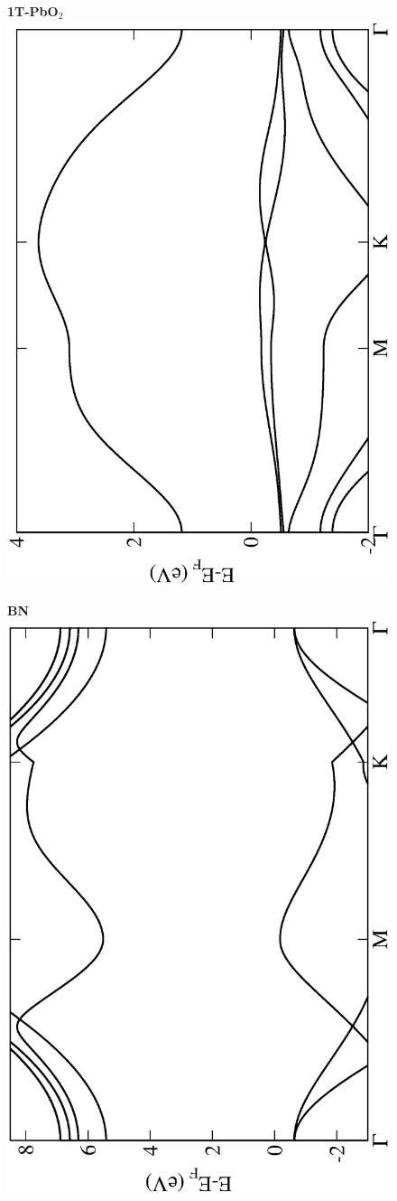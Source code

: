 \begin{figure}[htbp]
\centering
{\bfseries \sffamily 1T-PbO$_{2}$}\\
\includegraphics[width=0.45\linewidth, angle=-90, trim={2.9cm, 0cm, 2cm, 0cm}, clip]{img/SI_figs/BS/1T-PbO2.eps}
\end{figure}

\begin{figure}[htbp]
\centering
{\bfseries \sffamily BN}\\
\includegraphics[width=0.45\linewidth, angle=-90, trim={2.9cm, 0cm, 2cm, 0cm}, clip]{img/SI_figs/BS/hBN.eps}
\end{figure}

